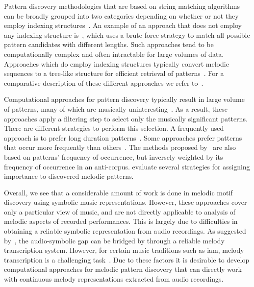 Pattern discovery methodologies that are based on string matching algorithms can be broadly grouped into two categories depending on whether or not they employ indexing structures~\citep{Janssen2013}. An example of an approach that does not employ any indexing structure is~\cite{nieto2012perceptual}, which uses a brute-force strategy to match all possible pattern candidates with different lengths. Such approaches tend to be computationally complex and often intractable for large volumes of data. Approaches which do employ indexing structures typically convert melodic sequences to a tree-like structure for efficient retrieval of patterns~\citep{Knopke2009,conklin2011comparative}. For a comparative description of these different approaches we refer to~\cite{Janssen2013,meredith2002algorithms}.

Computational approaches for pattern discovery typically result in large volume of patterns, many of which are musically uninteresting~\citep{marsden2012counselling,conklin2010discovery}. As a result, these approaches apply a filtering step to select only the musically significant patterns. There are different strategies to perform this selection. A frequently used approach is to prefer long duration patterns~\citep{Cambouropoulos2006,Karydis2006}. Some approaches prefer patterns that occur more frequently than others~\citep{Cambouropoulos2006,meredith2002algorithms}. The methods proposed by~\cite{conklin2010discovery,Conklin2010a} are also based on patterns' frequency of occurrence, but inversely weighted by its frequency of occurrence in an anti-corpus. \cite{collins2011modeling} evaluate several strategies for assigning importance to discovered melodic patterns.

Overall, we see that a considerable amount of work is done in melodic motif discovery using symbolic music representations. However, these approaches cover only a particular view of music, and are not directly applicable to analysis of melodic aspects of recorded performances. This is largely due to difficulties in obtaining a reliable symbolic representation from audio recordings. As suggested by~\cite{collins2014bridging}, the audio-symbolic gap can be bridged by through a reliable melody transcription system. However, for certain music traditions such as \gls{iam}, melody transcription is a challenging task~\citep{widdess1994involving}. Due to these factors it is desirable to develop computational approaches for melodic pattern discovery that can directly work with continuous melody representations extracted from audio recordings.


